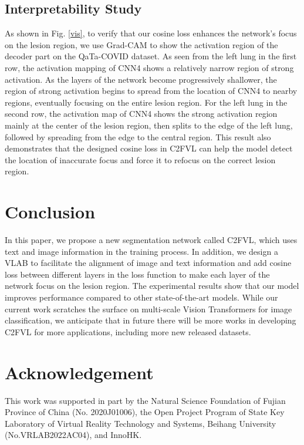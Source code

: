 \documentclass{article}
\begin{document}
\subsection{Interpretability Study}
\vspace{-3mm}
As shown in Fig. \ref{vis}, to verify that our cosine loss enhances the network's focus on the lesion region, we use Grad-CAM \cite{selvaraju2017grad} to show the activation region of the decoder part on the QaTa-COVID dataset. As seen from the left lung in the first row, the activation mapping of CNN4 shows a relatively narrow region of strong activation. As the layers of the network become progressively shallower, the region of strong activation begins to spread from the location of CNN4 to nearby regions, eventually focusing on the entire lesion region. For the left lung in the second row, the activation map of CNN4 shows the strong activation region mainly at the center of the lesion region, then splits to the edge of the left lung, followed by spreading from the edge to the central region. This result also demonstrates that the designed cosine loss in C2FVL can help the model detect the location of inaccurate focus and force it to refocus on the correct lesion region.
\vspace{-4mm}
\section{Conclusion}
\label{sec:conclusion}
\vspace{-3mm}
In this paper, we propose a new segmentation network called C2FVL, which uses text and image information in the training process. In addition, we design a VLAB to facilitate the alignment of image and text information and add cosine loss between different layers in the loss function to make each layer of the network focus on the lesion region. The experimental results show that our model improves performance compared to other state-of-the-art models. While our current work scratches the surface on multi-scale Vision Transformers for image classification, we anticipate that in future there will be more works in developing C2FVL for more applications, including more new released datasets.

\vspace{-2mm}
\section{Acknowledgement}
\vspace{-2mm}
This work was supported in part by the Natural Science Foundation of Fujian Province of China (No. 2020J01006), the Open Project Program of State Key Laboratory of Virtual Reality Technology and Systems, Beihang University (No.VRLAB2022AC04), and InnoHK. 
\end{document}
